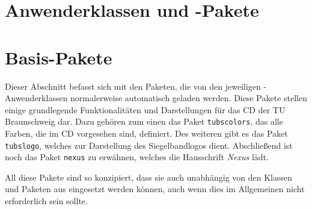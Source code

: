 \documentclass[%
  a4paper,%
  11pt,%
  twoside=false,%
  rgb,%
  extramargin,%
  parskip=half,%
]{tubsbook}
\begin{document}
\pagestyle{scrheadings}%

\tableofcontents


\newcommand{\newdocumentclass}[1]{\textcolor{tuRed}{\lstinline{#1}}}
\newcommand{\newpackage}[1]{\textcolor{tuRed}{\lstinline{#1}}}





\part{Anwenderklassen und -Pakete}







\part{Basis-Pakete}

Dieser Abschnitt befasst sich mit den Paketen, die von den jeweiligen
\tubslatex-Anwenderklassen normalerweise automatisch geladen werden.
Diese Pakete stellen einige grundlegende Funktionalitäten und Darstellungen
für das \acs{CD} der TU Braunschweig dar. Dazu gehören zum einen das Paket
\newpackage{tubscolors}, das alle Farben, die im \acs{CD} vorgesehen sind,
definiert. Des weiteren gibt es das Paket \newpackage{tubslogo}, welches
zur Darstellung des Siegelbandlogos dient. Abschließend ist noch das Paket
\newpackage{nexus} zu erwähnen, welches die Hausschrift \emph{Nexus}
lädt.

All diese Pakete sind so konzipiert, dass sie auch unabhängig von den
Klassen und Paketen aus \tubslatex eingesetzt werden können, auch wenn dies
im Allgemeinen nicht erforderlich sein sollte.




\appendix



\printglossary[style=altlist,title=Glossar]
\printglossary[type=\acronymtype,style=long]



\listoffigures



\end{document}
